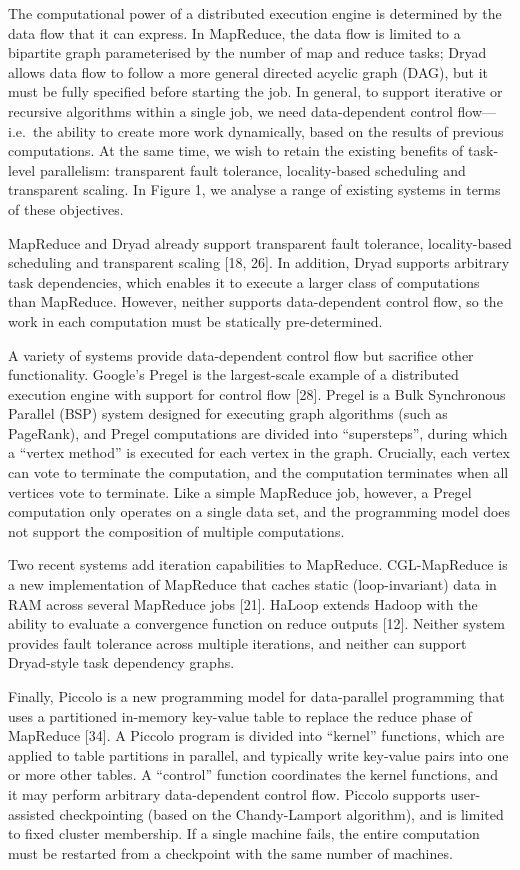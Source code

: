 \documentclass[
]{article}
\begin{document}
The computational power of a distributed execution engine is determined
by the data flow that it can express. In MapReduce, the data flow is
limited to a bipartite graph parameterised by the number of map and
reduce tasks; Dryad allows data flow to follow a more general directed
acyclic graph (DAG), but it must be fully specified before starting the
job. In general, to support iterative or recursive algorithms within a
single job, we need data-dependent control flow---i.e.~the ability to
create more work dynamically, based on the results of previous
computations. At the same time, we wish to retain the existing benefits
of task-level parallelism: transparent fault tolerance, locality-based
scheduling and transparent scaling. In Figure 1, we analyse a range of
existing systems in terms of these objectives.

MapReduce and Dryad already support transparent fault tolerance,
locality-based scheduling and transparent scaling {[}18, 26{]}. In
addition, Dryad supports arbitrary task dependencies, which enables it
to execute a larger class of computations than MapReduce. However,
neither supports data-dependent control flow, so the work in each
computation must be statically pre-determined.

A variety of systems provide data-dependent control flow but sacrifice
other functionality. Google's Pregel is the largest-scale example of a
distributed execution engine with support for control flow {[}28{]}.
Pregel is a Bulk Synchronous Parallel (BSP) system designed for
executing graph algorithms (such as PageRank), and Pregel computations
are divided into ``supersteps'', during which a ``vertex method'' is
executed for each vertex in the graph. Crucially, each vertex can vote
to terminate the computation, and the computation terminates when all
vertices vote to terminate. Like a simple MapReduce job, however, a
Pregel computation only operates on a single data set, and the
programming model does not support the composition of multiple
computations.

Two recent systems add iteration capabilities to MapReduce.
CGL-MapReduce is a new implementation of MapReduce that caches static
(loop-invariant) data in RAM across several MapReduce jobs {[}21{]}.
HaLoop extends Hadoop with the ability to evaluate a convergence
function on reduce outputs {[}12{]}. Neither system provides fault
tolerance across multiple iterations, and neither can support
Dryad-style task dependency graphs.

Finally, Piccolo is a new programming model for data-parallel
programming that uses a partitioned in-memory key-value table to replace
the reduce phase of MapReduce {[}34{]}. A Piccolo program is divided
into ``kernel'' functions, which are applied to table partitions in
parallel, and typically write key-value pairs into one or more other
tables. A ``control'' function coordinates the kernel functions, and it
may perform arbitrary data-dependent control flow. Piccolo supports
user-assisted checkpointing (based on the Chandy-Lamport algorithm), and
is limited to fixed cluster membership. If a single machine fails, the
entire computation must be restarted from a checkpoint with the same
number of machines.
\end{document}
